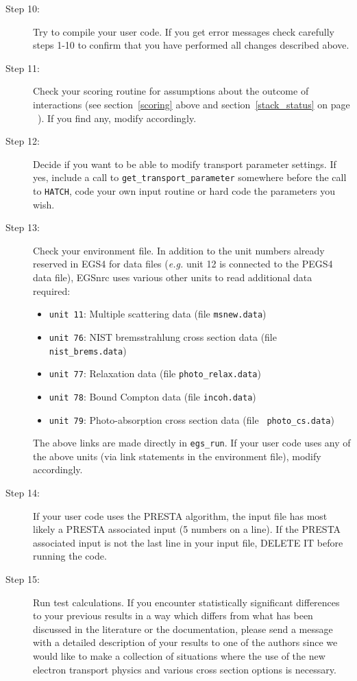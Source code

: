 \begin{description}
\item[Step 10:]
Try to compile your user code. If you get error messages 
check carefully steps 1-10 to confirm that you have performed all
changes described above.

\item[Step 11:]
Check your scoring routine for 
assumptions about the outcome of interactions 
(see section~\ref{scoring} above and section~\ref{stack_status} on page
~\pageref{stack_status}). If you find any, modify accordingly. 

\item[Step 12:]
Decide if you want to be able to modify transport parameter 
settings. If yes, include a call to {\tt get\_transport\_parameter} 
somewhere before the call to {\tt HATCH}, code your own input 
routine or hard code the parameters you wish. 

\item[Step 13:]
Check your environment file. In addition to the unit 
numbers already reserved in EGS4 for data files ({\em e.g.} unit 12 
is connected to the PEGS4 data file), EGSnrc uses various 
other units to read additional data required:
\begin{itemize}
\item
{\tt unit 11}: Multiple scattering data (file {\tt msnew.data})
\item
{\tt unit 76}: NIST bremsstrahlung cross section data (file {\tt 
nist\_brems.data})
\item
{\tt unit 77}: Relaxation data (file {\tt photo\_relax.data})
\item
{\tt unit 78}: Bound Compton data (file {\tt incoh.data})
\item
{\tt unit 79}: Photo-absorption cross section data (file {\tt 
photo\_cs.data})
\end{itemize}
The above links are made directly in {\tt egs\_run}.
If your user code uses any of the above units (via link 
statements in the environment file), modify accordingly.

\item[Step 14:]
If your user code uses the PRESTA algorithm, the 
input file has most likely a PRESTA associated 
input (5 numbers on a line). If the PRESTA associated 
input is not the last line in your input file, DELETE 
IT before running the code. 

\item[Step 15:]
Run test calculations. 
If you encounter statistically significant differences to your 
previous results in a way which differs from what has been discussed in the
literature or the documentation, please send a message with a detailed description of 
your results to one of the authors since we would like to 
make a collection of situations where the use of the 
new electron transport physics and various cross 
section options is necessary.
\end{description}

